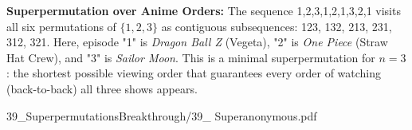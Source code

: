 \begin{SideNotePage}{
  \textbf{Superpermutation over Anime Orders:}  
  The sequence 1,2,3,1,2,1,3,2,1 visits all six permutations of $\{1,2,3\}$ as contiguous subsequences: 123, 132, 213, 231, 312, 321. Here, episode "1" is \emph{Dragon Ball Z} (Vegeta), "2" is \emph{One Piece} (Straw Hat Crew), and "3" is \emph{Sailor Moon}. This is a minimal superpermutation for $n=3$: the shortest possible viewing order that guarantees every order of watching (back-to-back) all three shows appears. \par
  }{39_SuperpermutationsBreakthrough/39_ Superanonymous.pdf}
\end{SideNotePage}
